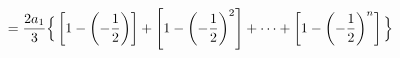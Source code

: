 \documentclass[preview]{standalone}
\begin{document}
\begin{align*}
\special{dvisvgm:raw <g id='unique000'>}=\frac{2a_1}{3}\Big\{\left[1-\left(-\frac{1}{2}\right)\right] \special{dvisvgm:raw </g>}\special{dvisvgm:raw <g id='unique001'>}+\left[1-\left(-\frac{1}{2}\right)^2\right] \special{dvisvgm:raw </g>}\special{dvisvgm:raw <g id='unique002'>}+\cdots \special{dvisvgm:raw </g>}\special{dvisvgm:raw <g id='unique003'>}+\left[1-\left(-\frac{1}{2}\right)^n\right]\Big\}\special{dvisvgm:raw </g>}
\end{align*}
\end{document}
